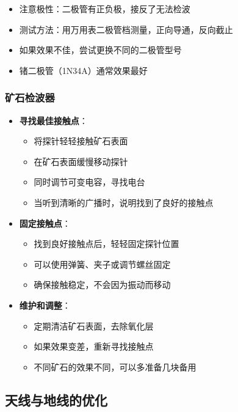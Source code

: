 \documentclass[12pt,UTF8]{ctexbook}
\begin{document}
\begin{itemize}[leftmargin=3.5em]
    \item 注意极性：二极管有正负极，接反了无法检波
    \item 测试方法：用万用表二极管档测量，正向导通，反向截止
    \item 如果效果不佳，尝试更换不同的二极管型号
    \item 锗二极管（1N34A）通常效果最好
\end{itemize}

\subsubsection{矿石检波器}

\begin{itemize}[leftmargin=3.5em]
    \item \textbf{寻找最佳接触点}：
        \begin{itemize}[leftmargin=3.5em]
            \item 将探针轻轻接触矿石表面
            \item 在矿石表面缓慢移动探针
            \item 同时调节可变电容，寻找电台
            \item 当听到清晰的广播时，说明找到了良好的接触点
        \end{itemize}
    \item \textbf{固定接触点}：
        \begin{itemize}[leftmargin=3.5em]
            \item 找到良好接触点后，轻轻固定探针位置
            \item 可以使用弹簧、夹子或调节螺丝固定
            \item 确保接触稳定，不会因为振动而移动
        \end{itemize}
    \item \textbf{维护和调整}：
        \begin{itemize}[leftmargin=3.5em]
            \item 定期清洁矿石表面，去除氧化层
            \item 如果效果变差，重新寻找接触点
            \item 不同矿石的效果不同，可以多准备几块备用
        \end{itemize}
\end{itemize}

\subsection{天线与地线的优化}
\end{document}
